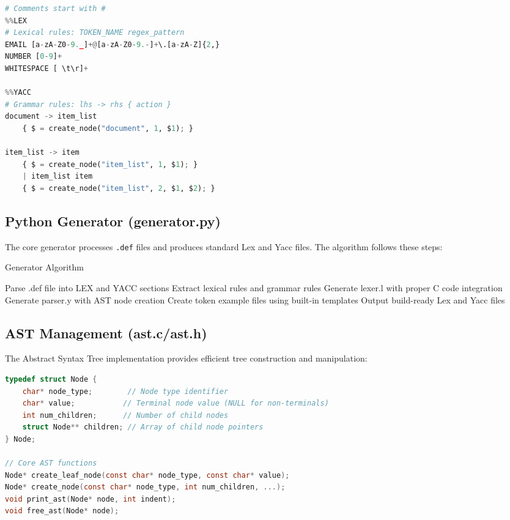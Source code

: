 \documentclass[a4paper,12pt]{report}
\begin{document}
\begin{lstlisting}[language=Python, caption=Sample .def File Structure, label=lst:def_format]
# Comments start with #
%%LEX
# Lexical rules: TOKEN_NAME regex_pattern
EMAIL [a-zA-Z0-9._]+@[a-zA-Z0-9.-]+\.[a-zA-Z]{2,}
NUMBER [0-9]+
WHITESPACE [ \t\r]+

%%YACC  
# Grammar rules: lhs -> rhs { action }
document -> item_list
    { $ = create_node("document", 1, $1); }

item_list -> item
    { $ = create_node("item_list", 1, $1); }
    | item_list item
    { $ = create_node("item_list", 2, $1, $2); }
\end{lstlisting}

\subsection{Python Generator (generator.py)}
The core generator processes \texttt{.def} files and produces standard Lex and Yacc files. The algorithm follows these steps:

\begin{algorithm}[H]
\caption{Generator Algorithm}
\begin{algorithmic}[1]
\STATE Parse .def file into LEX and YACC sections
\STATE Extract lexical rules and grammar rules
\STATE Generate lexer.l with proper C code integration
\STATE Generate parser.y with AST node creation
\STATE Create token example files using built-in templates
\STATE Output build-ready Lex and Yacc files
\end{algorithmic}
\end{algorithm}

\subsection{AST Management (ast.c/ast.h)}
The Abstract Syntax Tree implementation provides efficient tree construction and manipulation:

\begin{lstlisting}[language=C, caption=AST Node Structure, label=lst:ast_structure]
typedef struct Node {
    char* node_type;        // Node type identifier
    char* value;           // Terminal node value (NULL for non-terminals)
    int num_children;      // Number of child nodes
    struct Node** children; // Array of child node pointers
} Node;

// Core AST functions
Node* create_leaf_node(const char* node_type, const char* value);
Node* create_node(const char* node_type, int num_children, ...);
void print_ast(Node* node, int indent);
void free_ast(Node* node);
\end{lstlisting}
\end{document}
